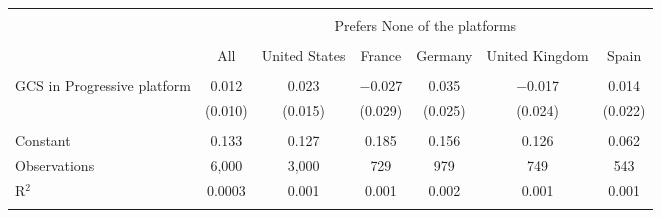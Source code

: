 
\begin{tabular}{@{\extracolsep{5pt}}lcccccc} 
\\[-1.8ex]\hline 
\hline \\[-1.8ex] 
 & \multicolumn{6}{c}{Prefers None of the platforms} \\ 
\cline{2-7} 
\\[-1.8ex] & All & United States & France & Germany & United Kingdom & Spain \\ 
\hline \\[-1.8ex] 
 GCS in Progressive platform & 0.012 & 0.023 & $-$0.027 & 0.035 & $-$0.017 & 0.014 \\ 
  & (0.010) & (0.015) & (0.029) & (0.025) & (0.024) & (0.022) \\ 
 \hline \\[-1.8ex] 
Constant & 0.133 & 0.127 & 0.185 & 0.156 & 0.126 & 0.062 \\ 
Observations & 6,000 & 3,000 & 729 & 979 & 749 & 543 \\ 
R$^{2}$ & 0.0003 & 0.001 & 0.001 & 0.002 & 0.001 & 0.001 \\ 
\hline 
\hline \\[-1.8ex] 
\end{tabular} 